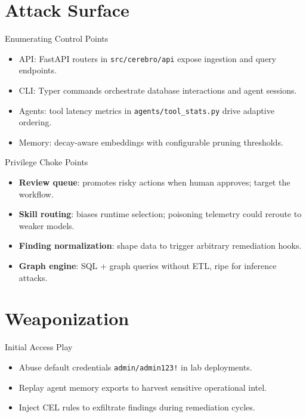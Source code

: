 \documentclass[aspectratio=169]{beamer}
\begin{document}
\section{Attack Surface}

\begin{frame}{Enumerating Control Points}
  \begin{itemize}
    \item API: FastAPI routers in \texttt{src/cerebro/api} expose ingestion and query endpoints.
    \item CLI: Typer commands orchestrate database interactions and agent sessions.
    \item Agents: tool latency metrics in \texttt{agents/tool\_stats.py} drive adaptive ordering.
    \item Memory: decay-aware embeddings with configurable pruning thresholds.
  \end{itemize}
\end{frame}

\begin{frame}{Privilege Choke Points}
  \begin{itemize}
    \item \textbf{Review queue}: promotes risky actions when human approves; target the workflow.
    \item \textbf{Skill routing}: biases runtime selection; poisoning telemetry could reroute to weaker models.
    \item \textbf{Finding normalization}: shape data to trigger arbitrary remediation hooks.
    \item \textbf{Graph engine}: SQL + graph queries without ETL, ripe for inference attacks.
  \end{itemize}
\end{frame}

\section{Weaponization}

\begin{frame}{Initial Access Play}
  \begin{itemize}
    \item Abuse default credentials \texttt{admin/admin123!} in lab deployments.
    \item Replay agent memory exports to harvest sensitive operational intel.
    \item Inject CEL rules to exfiltrate findings during remediation cycles.
  \end{itemize}
\end{frame}
\end{document}
